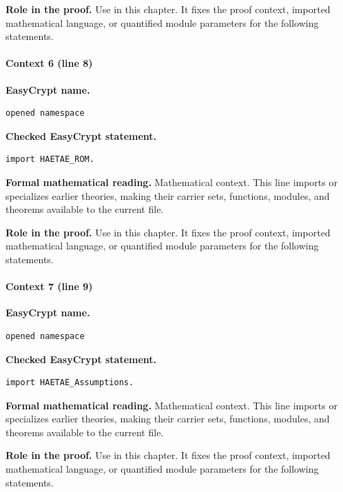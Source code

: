 \noindent\textbf{Role in the proof.}
Use in this chapter. It fixes the proof context, imported mathematical language, or quantified module parameters for the following statements.

\paragraph{Context 6 (line 8)}
\noindent\textbf{EasyCrypt name.}
\begin{lstlisting}[language=EasyCrypt,basicstyle=\ttfamily\scriptsize]
opened namespace
\end{lstlisting}
\noindent\textbf{Checked EasyCrypt statement.}
\begin{lstlisting}[language=EasyCrypt,basicstyle=\ttfamily\scriptsize]
import HAETAE_ROM.
\end{lstlisting}
\noindent\textbf{Formal mathematical reading.}
Mathematical context. This line imports or specializes earlier theories, making their carrier sets, functions, modules, and theorems available to the current file.

\noindent\textbf{Role in the proof.}
Use in this chapter. It fixes the proof context, imported mathematical language, or quantified module parameters for the following statements.

\paragraph{Context 7 (line 9)}
\noindent\textbf{EasyCrypt name.}
\begin{lstlisting}[language=EasyCrypt,basicstyle=\ttfamily\scriptsize]
opened namespace
\end{lstlisting}
\noindent\textbf{Checked EasyCrypt statement.}
\begin{lstlisting}[language=EasyCrypt,basicstyle=\ttfamily\scriptsize]
import HAETAE_Assumptions.
\end{lstlisting}
\noindent\textbf{Formal mathematical reading.}
Mathematical context. This line imports or specializes earlier theories, making their carrier sets, functions, modules, and theorems available to the current file.

\noindent\textbf{Role in the proof.}
Use in this chapter. It fixes the proof context, imported mathematical language, or quantified module parameters for the following statements.

